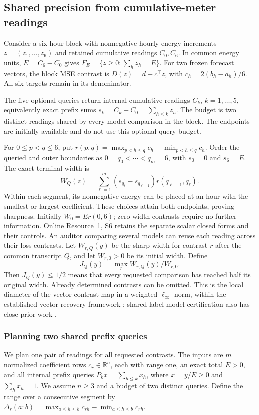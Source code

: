 \documentclass[12pt]{article}
\begin{document}
\subsection{Shared precision from cumulative-meter readings}
\label{sec:counter-precision-method}
Consider a six-hour block with nonnegative hourly energy increments
$z=(z_1,\ldots,z_6)$ and retained cumulative readings $C_0,C_6$.
In common energy units, $E=C_6-C_0$ gives
$F_E=\{z\geq0:\sum_hz_h=E\}$. For two frozen forecast vectors,
the block MSE contrast is $D(z)=d+c^\top z$, with
$c_h=2(b_h-a_h)/6$. All six targets remain in its denominator.

The five optional queries return internal cumulative readings $C_k$,
$k=1,\ldots,5$, equivalently exact prefix sums
$s_k=C_k-C_0=\sum_{h\leq k}z_h$. The budget is two distinct readings
shared by every model comparison in the block. The endpoints are initially
available and do not use this optional-query budget.

For $0\leq p<q\leq6$, put
$r(p,q)=\max_{p<h\leq q}c_h-\min_{p<h\leq q}c_h$.
Order the queried and outer boundaries as $0=q_0<\cdots<q_m=6$,
with $s_0=0$ and $s_6=E$. The exact terminal width is
\begin{equation}
 W_Q(z)=\sum_{\ell=1}^{m}
 (s_{q_\ell}-s_{q_{\ell-1}})r(q_{\ell-1},q_\ell).
 \label{eq:counter-width}
\end{equation}
Within each segment, its nonnegative energy can be placed at an hour with
the smallest or largest coefficient. These choices attain both endpoints,
proving sharpness. Initially $W_0=Er(0,6)$; zero-width contrasts require
no further information. Online Resource~1, S6 retains the separate scalar
closed forms and their controls.
An auditor comparing several models can reuse each reading across their
loss contrasts. Let $W_{r,Q}(y)$ be the sharp width for contrast $r$ after
the common transcript $Q$, and let $W_{r,0}>0$ be its initial width. Define
\[
 J_Q(y)=\max_r W_{r,Q}(y)/W_{r,0}.
\]
Then $J_Q(y)\leq1/2$ means that every requested comparison has reached
half its original width. Already determined contrasts can be omitted.
This is the local diameter of the vector contrast map in a weighted
$\ell_\infty$ norm, within the established vector-recovery framework
\citep{krieg2025}; shared-label model certification also has close prior
work \citep{kuboyama2026}.

\subsubsection{Planning two shared prefix queries}
\label{sec:shared-planner-algorithm}
We plan one pair of readings for all requested contrasts.  The inputs are
$m$ normalized coefficient rows $c_r\in\mathbb R^n$, each with range one,
an exact total $E>0$, and all internal prefix queries
$P_kx=\sum_{h\leq k}x_h$, where $x=y/E\geq0$ and $\sum_hx_h=1$.
We assume $n\geq3$ and a budget of two distinct queries.  Define the range
over a consecutive segment by
$\Delta_r(a{:}b)=\max_{a\leq h\leq b}c_{rh}-\min_{a\leq h\leq b}c_{rh}$.
\end{document}
